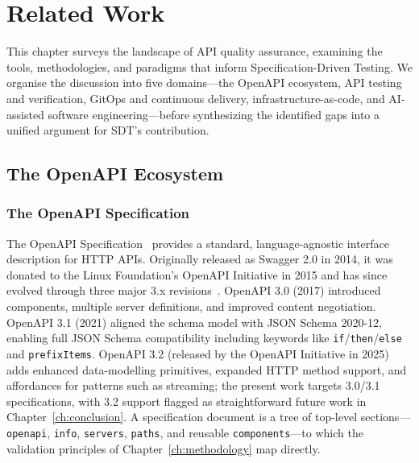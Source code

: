 \chapter{Related Work}
\label{ch:related-work}

This chapter surveys the landscape of API quality assurance, examining the tools, methodologies, and paradigms that inform Specification-Driven Testing. We organise the discussion into five domains---the OpenAPI ecosystem, API testing and verification, GitOps and continuous delivery, infrastructure-as-code, and AI-assisted software engineering---before synthesizing the identified gaps into a unified argument for SDT's contribution.

\section{The OpenAPI Ecosystem}
\label{sec:openapi-ecosystem}

\subsection{The OpenAPI Specification}
\label{subsec:openapi-spec}

The OpenAPI Specification~\cite{openapi} provides a standard, language-agnostic interface description for HTTP APIs. Originally released as Swagger 2.0 in 2014, it was donated to the Linux Foundation's OpenAPI Initiative in 2015 and has since evolved through three major 3.x revisions~\cite{swagger-history}. OpenAPI 3.0 (2017) introduced components, multiple server definitions, and improved content negotiation. OpenAPI 3.1 (2021) aligned the schema model with JSON Schema 2020-12, enabling full JSON Schema compatibility including keywords like \texttt{if}/\texttt{then}/\texttt{else} and \texttt{prefixItems}. OpenAPI 3.2 (released by the OpenAPI Initiative in 2025) adds enhanced data-modelling primitives, expanded HTTP method support, and affordances for patterns such as streaming; the present work targets 3.0/3.1 specifications, with 3.2 support flagged as straightforward future work in Chapter~\ref{ch:conclusion}. A specification document is a tree of top-level sections---\texttt{openapi}, \texttt{info}, \texttt{servers}, \texttt{paths}, and reusable \texttt{components}---to which the validation principles of Chapter~\ref{ch:methodology} map directly.

